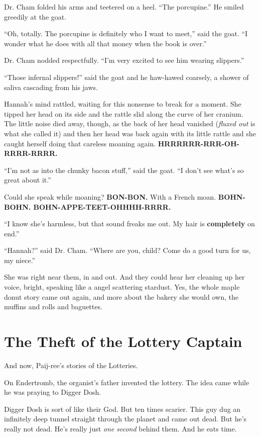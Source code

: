 \documentclass[12pt,twoside]{report}
\begin{document}
Dr. Cham folded his arms and teetered on a heel.  ``The porcupine.''
He smiled greedily at the goat.

``Oh, totally.  The porcupine is definitely who I want to meet,'' said
the goat.  ``I wonder what he does with all that money when the book
is over.''

Dr. Cham nodded respectfully.  ``I'm very excited to see him wearing
slippers.''

``Those infernal slippers!'' said the goat and he haw-hawed coarsely,
a shower of saliva cascading from his jaws.

Hannah's mind rattled, waiting for this nonsense to break for a
moment. She tipped her head on its side and the rattle slid along the
curve of her cranium.  The little noise died away, though, as the back
of her head vanished ({\em fluxed out} is what she called it) and then
her head was back again with its little rattle and she caught herself
doing that careless moaning again.  {\bf HRRRRRR-RRR-OH-RRRR-RRRR.}

``I'm not as into the chunky bacon stuff,'' said the goat.  ``I don't
see what's so great about it.''

Could she speak while moaning? {\bf BON-BON.}  With a French moan.
{\bf BOHN-BOHN. BOHN-APPE-TEET-OHHHH-RRRR.}

``I know she's harmless, but that sound freaks me out.  My hair is
{\bf completely} on end.''

``Hannah?'' said Dr. Cham.  ``Where are you, child?  Come do a good
turn for us, my niece.''

She was right near them, in and out.  And they could hear her cleaning
up her voice, bright, speaking like a angel scattering stardust. Yes,
the whole maple donut story came out again, and more about the bakery
she would own, the muffins and rolls and baguettes.

\newpage


\section{The Theft of the Lottery Captain}




And now, Paij-ree's stories of the Lotteries.

On Endertromb, the organist's father invented the lottery.  The idea
came while he was praying to Digger Dosh.

Digger Dosh is sort of like their God.  But ten times scarier.  This
guy dug an infinitely deep tunnel straight through the planet and came
out dead. But he's really not dead.  He's really just {\em one second}
behind them.  And he eats time.
\end{document}

